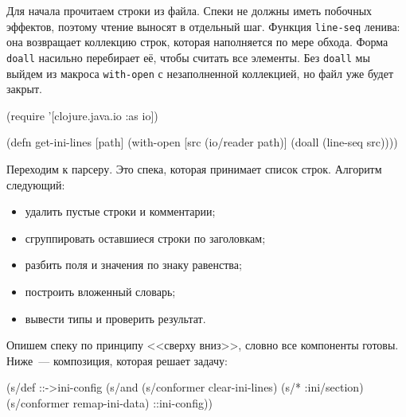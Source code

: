 
Для начала прочитаем строки из файла. Спеки не должны иметь побочных эффектов,
поэтому чтение выносят в отдельный шаг. Функция \verb|line-seq| ленива: она
возвращает коллекцию строк, которая наполняется по мере обхода. Форма
\verb|doall| насильно перебирает её, чтобы считать все элементы. Без
\verb|doall| мы выйдем из макроса \verb|with-open| с незаполненной
коллекцией, но файл уже будет закрыт.



\begin{english}
  \begin{clojure}
(require '[clojure.java.io :as io])

(defn get-ini-lines [path]
  (with-open [src (io/reader path)]
    (doall (line-seq src))))
  \end{clojure}
\end{english}

Переходим к парсеру. Это спека, которая принимает список строк. Алгоритм
следующий:

\begin{itemize}

\item
  удалить пустые строки и комментарии;

\item
  сгруппировать оставшиеся строки по заголовкам;

\item
  разбить поля и значения по знаку равенства;

\item
  построить вложенный словарь;

\item
  вывести типы и проверить результат.

\end{itemize}

Опишем спеку по принципу <<сверху вниз>>, словно все компоненты готовы. Ниже~---
композиция, которая решает задачу:

\begin{english}
  \begin{clojure}
(s/def ::->ini-config
  (s/and
   (s/conformer clear-ini-lines)
   (s/* :ini/section)
   (s/conformer remap-ini-data)
   ::ini-config))
  \end{clojure}
\end{english}

